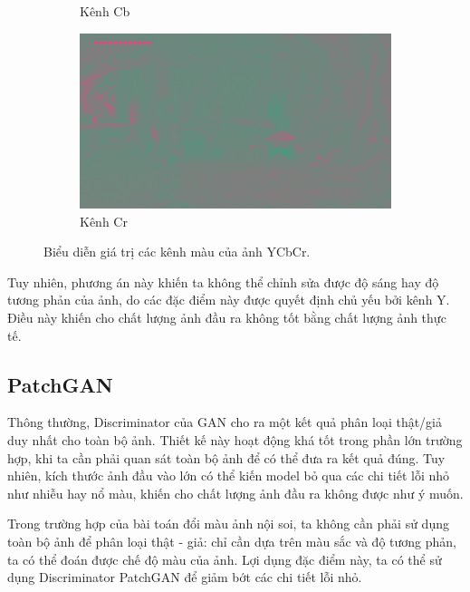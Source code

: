 \documentclass[12pt]{extreport}
\begin{document}
\begin{figure}[H]
\begin{subfigure}[H]{0.3\textwidth}
        \caption{Kênh Cb}
    \end{subfigure}
    \begin{subfigure}[H]{0.3\textwidth}
        \centering
        \includegraphics[width=\linewidth]{figure32.png}
        \caption{Kênh Cr}
    \end{subfigure}
    \caption{Biểu diễn giá trị các kênh màu của ảnh YCbCr.}
    \label{figure_ycbcr}
\end{figure}

Tuy nhiên, phương án này khiến ta không thể chỉnh sửa được độ sáng hay độ tương phản của ảnh, do các đặc điểm này được quyết định chủ yếu bởi kênh Y. Điều này khiến cho chất lượng ảnh đầu ra không tốt bằng chất lượng ảnh thực tế.

\subsection{PatchGAN}
\label{patchgan}

Thông thường, Discriminator của GAN cho ra một kết quả phân loại thật/giả duy nhất cho toàn bộ ảnh. Thiết kế này hoạt động khá tốt trong phần lớn trường hợp, khi ta cần phải quan sát toàn bộ ảnh để có thể đưa ra kết quả đúng. Tuy nhiên, kích thước ảnh đầu vào lớn có thể kiến model bỏ qua các chi tiết lỗi nhỏ như nhiễu hay nổ màu, khiến cho chất lượng ảnh đầu ra không được như ý muốn.

Trong trường hợp của bài toán đổi màu ảnh nội soi, ta không cần phải sử dụng toàn bộ ảnh để phân loại thật - giả: chỉ cần dựa trên màu sắc và độ tương phản, ta có thể đoán được chế độ màu của ảnh. Lợi dụng đặc điểm này, ta có thể sử dụng Discriminator PatchGAN để giảm bớt các chi tiết lỗi nhỏ.
\end{document}
